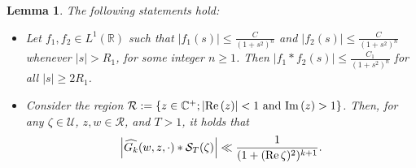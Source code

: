 \documentclass[a4paper,reqno,12pt]{amsart}
\newtheorem{lemma}[theorem]{Lemma}
\newcommand{\R}{\mathcal{R}}
\renewcommand{\S}{\mathcal{S}}
\newcommand{\U}{\mathcal{U}}
\renewcommand{\r}{\mathbb{R}}
\newcommand{\cp}{\mathbb{C}} %
\newcommand{\ft}{\widehat}
\newcommand{\cd}{\cdot}
\newcommand{\1}{{\bf 1}}
\renewcommand{\Re}{{\rm Re}\,}
\renewcommand{\Im}{{\rm Im}\,}
\begin{document}
\begin{lemma}
    \label{lemma:asymptotic_decay}
    The following statements hold:
    \begin{itemize}
        \item[i)] Let $f_1,f_2\in L^1(\r)$ such that $|f_1(s)|\leq\frac{C}{(1+s^2)^n}$ and $|f_2(s)|\leq\frac{C}{(1+s^2)^n}$ whenever $|s|>R_1$, for some integer $n\geq1$. Then $|f_1*f_2(s)|\leq\frac{C_1}{(1+s^2)^n}$ for all $|s|\geq2R_1$.
        \item[ii)] Consider the region $\R:=\{z\in\cp^+;|\Re(z)|<1 \text{ and } \Im(z)>1\}$. Then, for any $\zeta\in\U$, $z,w\in\R$, and $T>1$, it holds that
        \begin{equation}
        \label{eq:unif_estimate_lemma}
        \left|\ft{G_k}(w,z,\cd)* \S_T(\zeta)\right|\ll\frac{1}{(1+(\Re{\zeta})^2)^{k+1}}.
        \end{equation}
    \end{itemize}
\end{lemma}
\end{document}
